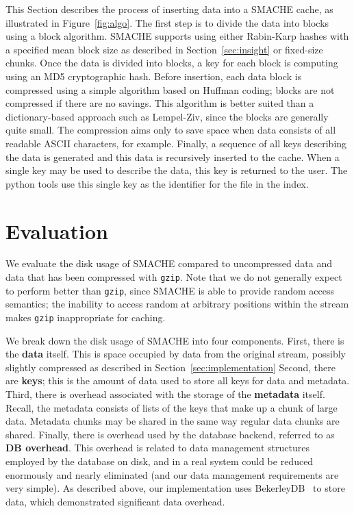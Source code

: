 \documentclass{sigplanconf}[11pt]
\begin{document}
This Section describes the process of inserting data into a SMACHE cache, as
illustrated in Figure~\ref{fig:algo}.  The first step is to divide the data
into blocks using a block algorithm.  SMACHE supports using either Rabin-Karp
hashes with a specified mean block size as described in
Section~\ref{sec:insight} or fixed-size chunks.  Once the data is divided into
blocks, a key for each block is computing using an MD5 cryptographic hash.
Before insertion, each data block is compressed using a simple algorithm based
on Huffman coding; blocks are not compressed if there are no savings.  This
algorithm is better suited than a dictionary-based approach such as Lempel-Ziv,
since the blocks are generally quite small.  The compression aims only to save
space when data consists of all readable ASCII characters, for example.
Finally, a sequence of all keys describing the data is generated and this data
is recursively inserted to the cache.  When a single key may be used to
describe the data, this key is returned to the user.  The python tools use this
single key as the identifier for the file in the index.

\section{Evaluation}
\label{sec:evaluation}

We evaluate the disk usage of SMACHE compared to uncompressed data and data
that has been compressed with {\tt gzip}.  Note that we do not generally expect
to perform better than {\tt gzip}, since SMACHE is able to provide random
access semantics; the inability to access random at arbitrary positions within
the stream makes {\tt gzip} inappropriate for caching.

We break down the disk usage of SMACHE into four components.  First, there is
the {\bf data} itself.  This is space occupied by data from the original
stream, possibly slightly compressed as described in
Section~\ref{sec:implementation} Second, there are {\bf keys}; this is the
amount of data used to store all keys for data and metadata.  Third, there is
overhead associated with the storage of the {\bf metadata} itself.  Recall, the
metadata consists of lists of the keys that make up a chunk of large data.
Metadata chunks may be shared in the same way regular data chunks are shared.
Finally, there is overhead used by the database backend, referred to as {\bf DB
overhead}.  This overhead is related to data management structures employed by
the database on disk, and in a real system could be reduced enormously and
nearly eliminated (and our data management requirements are very simple).  As
described above, our implementation uses BekerleyDB~\cite{berkeleydb} to store
data, which demonstrated significant data overhead.
\end{document}
